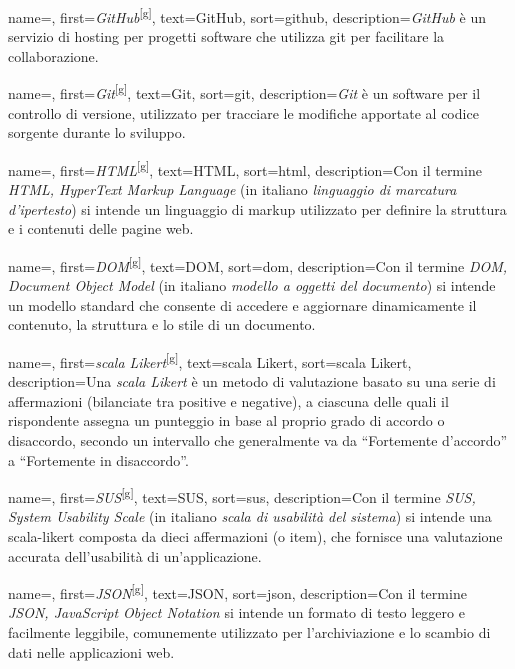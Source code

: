  {
    name=,
    first={\textit{GitHub}\textsuperscript{[g]}},
    text=GitHub,
    sort=github,
    description={\textit{GitHub} è un servizio di hosting per progetti software che utilizza \gls{git} per facilitare la collaborazione.}
}

 {
    name=,
    first={\textit{Git}\textsuperscript{[g]}},
    text=Git,
    sort=git,
    description={\textit{Git} è un software per il controllo di versione, utilizzato per tracciare le modifiche apportate al codice sorgente durante lo sviluppo.}
}

 {
    name=,
    first={\textit{HTML}\textsuperscript{[g]}},
    text=HTML,
    sort=html,
    description={Con il termine \textit{HTML, HyperText Markup Language} (in italiano \textit{linguaggio di marcatura d'ipertesto}) si intende un linguaggio di markup utilizzato per definire la struttura e i contenuti delle pagine web.}
}

 {
    name=,
    first={\textit{DOM}\textsuperscript{[g]}},
    text=DOM,
    sort=dom,
    description={Con il termine \textit{DOM, Document Object Model} (in italiano \textit{modello a oggetti del documento}) si intende un modello standard che consente di accedere e aggiornare dinamicamente il contenuto, la struttura e lo stile di un documento.}
}

 {
    name=,
    first={\textit{scala Likert}\textsuperscript{[g]}},
    text=scala Likert,
    sort=scala Likert,
    description={Una \textit{scala Likert} è un metodo di valutazione basato su una serie di affermazioni (bilanciate tra positive e negative), a ciascuna delle quali il rispondente assegna un punteggio in base al proprio grado di accordo o disaccordo, secondo un intervallo che generalmente va da “Fortemente d'accordo” a “Fortemente in disaccordo”.}
}

 {
    name=,
    first={\textit{SUS}\textsuperscript{[g]}},
    text=SUS,
    sort=sus,
    description={Con il termine \textit{SUS, System Usability Scale} (in italiano \textit{scala di usabilità del sistema}) si intende una \gls{scala-likert} composta da dieci affermazioni (o item), che fornisce una valutazione accurata dell'usabilità di un'applicazione.}
}

 {
    name=,
    first={\textit{JSON}\textsuperscript{[g]}},
    text=JSON,
    sort=json,
    description={Con il termine \textit{JSON, JavaScript Object Notation} si intende un formato di testo leggero e facilmente leggibile, comunemente utilizzato per l’archiviazione e lo scambio di dati nelle applicazioni web.}
}

